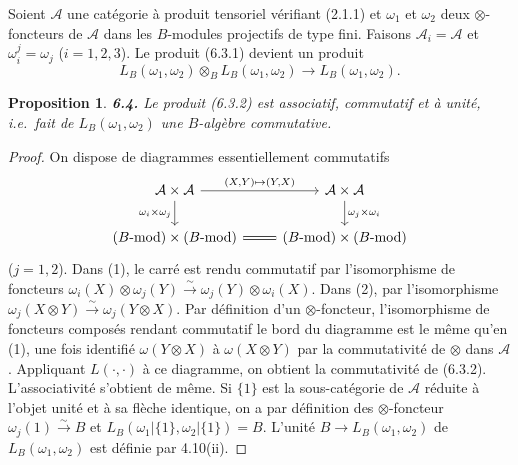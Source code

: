 \documentclass[12pt,a4paper]{article}
\theoremstyle{plain}
\newtheorem{proposition}[theorem]{Proposition}
\theoremstyle{definition}
\theoremstyle{remark}
\begin{document}
Soient $\mathcal{A}$ une catégorie à produit tensoriel vérifiant (2.1.1) et $\omega_1$ et $\omega_2$ deux $\otimes$-foncteurs de $\mathcal{A}$ dans les $B$-modules projectifs de type fini. Faisons $\mathcal{A}_i = \mathcal{A}$ et $\omega_i^j = \omega_j$ ($i = 1,2,3$). Le produit (6.3.1) devient un produit
\begin{equation}\label{eq:6.3.2}
L_B(\omega_1, \omega_2) \otimes_B L_B(\omega_1, \omega_2) \longrightarrow L_B(\omega_1, \omega_2).
\end{equation}

\begin{proposition}\label{prop:6.4}
\textbf{6.4.} Le produit (6.3.2) est associatif, commutatif et à unité, i.e.~fait de $L_B(\omega_1,\omega_2)$ une $B$-algèbre commutative.
\end{proposition}

\begin{proof}
On dispose de diagrammes essentiellement commutatifs
\[
\begin{tikzcd}
\mathcal{A} \times \mathcal{A} \arrow[r, "{(X,Y) \mapsto (Y,X)}"] \arrow[d, "\omega_i \times \omega_j"'] & \mathcal{A} \times \mathcal{A} \arrow[d, "\omega_j \times \omega_i"] \\
(B\text{-mod}) \times (B\text{-mod}) \arrow[r, equal] & (B\text{-mod}) \times (B\text{-mod})
\end{tikzcd}
\]
($j = 1,2$). Dans (1), le carré est rendu commutatif par l'isomorphisme de foncteurs $\omega_i(X) \otimes \omega_j(Y) \xrightarrow{\sim} \omega_j(Y) \otimes \omega_i(X)$. Dans (2), par l'isomorphisme $\omega_j(X \otimes Y) \xrightarrow{\sim} \omega_j(Y \otimes X)$. Par définition d'un $\otimes$-foncteur, l'isomorphisme de foncteurs composés rendant commutatif le bord du diagramme est le même qu'en (1), une fois identifié $\omega(Y \otimes X)$ à $\omega(X \otimes Y)$ par la commutativité de $\otimes$ dans $\mathcal{A}$. Appliquant $L(\cdot,\cdot)$ à ce diagramme, on obtient la commutativité de (6.3.2). L'associativité s'obtient de même. Si $\{1\}$ est la sous-catégorie de $\mathcal{A}$ réduite à l'objet unité et à sa flèche identique, on a par définition des $\otimes$-foncteur $\omega_j(1) \xrightarrow{\sim} B$ et $L_B(\omega_1|\{1\}, \omega_2|\{1\}) = B$. L'unité $B \to L_B(\omega_1,\omega_2)$ de $L_B(\omega_1,\omega_2)$ est définie par 4.10(ii).
\end{proof}

\subsection{}
\end{document}
